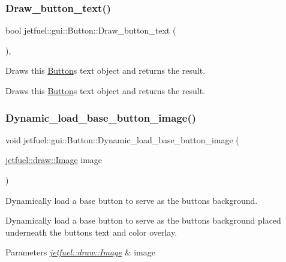 \subsubsection{\texorpdfstring{Draw\+\_\+button\+\_\+text()}{Draw\_button\_text()}}
{\footnotesize\ttfamily bool jetfuel\+::gui\+::\+Button\+::\+Draw\+\_\+button\+\_\+text (\begin{DoxyParamCaption}{ }\end{DoxyParamCaption})\hspace{0.3cm}{\ttfamily [inline]}, {\ttfamily [protected]}}



Draws this \hyperlink{classjetfuel_1_1gui_1_1Button}{Button}\textquotesingle{}s text object and returns the result. 

Draws this \hyperlink{classjetfuel_1_1gui_1_1Button}{Button}\textquotesingle{}s text object and returns the result. \mbox{\label{classjetfuel_1_1gui_1_1Button_a452110801fca1b3274d574ebc671e8db}} 
\subsubsection{\texorpdfstring{Dynamic\+\_\+load\+\_\+base\+\_\+button\+\_\+image()}{Dynamic\_load\_base\_button\_image()}}
{\footnotesize\ttfamily void jetfuel\+::gui\+::\+Button\+::\+Dynamic\+\_\+load\+\_\+base\+\_\+button\+\_\+image (\begin{DoxyParamCaption}\item[{\hyperlink{classjetfuel_1_1draw_1_1Image}{jetfuel\+::draw\+::\+Image}}]{image }\end{DoxyParamCaption})\hspace{0.3cm}{\ttfamily [inline]}}



Dynamically load a base button to serve as the button\textquotesingle{}s background. 

Dynamically load a base button to serve as the button\textquotesingle{}s background placed underneath the button\textquotesingle{}s text and color overlay.


\begin{DoxyParams}{Parameters}
{\em \hyperlink{classjetfuel_1_1draw_1_1Image}{jetfuel\+::draw\+::\+Image}} & image \\
\hline
\end{DoxyParams}
\mbox{\label{classjetfuel_1_1gui_1_1Button_a4269075522becce58d220d3aa4bbd6ec}} 
